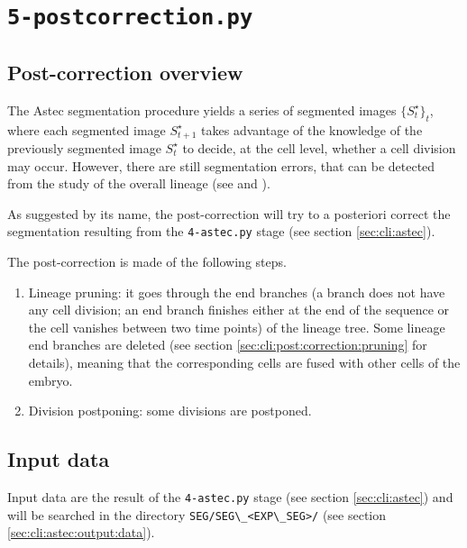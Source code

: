 \section{\texttt{5-postcorrection.py}}
\label{sec:cli:post:correction}

\subsection{Post-correction overview}

The Astec segmentation procedure yields a series of segmented images $\{S^{\star}_t\}_t$, where each segmented image $S^{\star}_{t+1}$ takes advantage of the knowledge of the previously segmented image $S^{\star}_t$ to decide, at the cell level, whether a cell division may occur. However, there are still segmentation errors, that can be detected from the study of the overall lineage (see \cite[section 2.3.3.7, page 74]{guignard:tel-01278725} and \cite[supp. mat.]{guignard:hal-02903409}).

As suggested by its name, the post-correction will try to a posteriori correct the segmentation resulting from the  \verb|4-astec.py| stage (see section \ref{sec:cli:astec}). 

The post-correction is made of the following steps.
\begin{enumerate}
\item \label{it:post:pruning} Lineage pruning: 
it goes through the end branches (a branch does not have any cell division; an end branch finishes either at the end of the sequence or the cell vanishes between two time points) of the lineage tree.
Some lineage end branches are deleted (see section \ref{sec:cli:post:correction:pruning} for details), meaning that the corresponding cells are fused with other cells of the embryo.
\item \label{it:post:division} Division postponing: some divisions are postponed.
\end{enumerate}




\subsection{Input data}
\label{sec:cli:post:correction:input:data}
Input data are the result of the \verb|4-astec.py| stage (see section \ref{sec:cli:astec}) and will be searched in the directory \verb|SEG/SEG\_<EXP\_SEG>/| (see section \ref{sec:cli:astec:output:data}).



